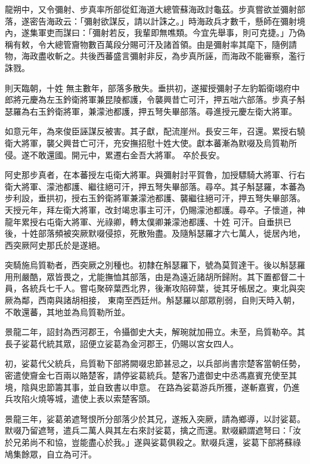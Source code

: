\begin{pinyinscope}
 龍朔中，又令彌射、步真率所部從釭海道大總管蘇海政討龜茲。步真嘗欲並彌射部落，遂密告海政云：「彌射欲謀反，請以計誅之。」時海政兵才數千，懸師在彌射境內，遂集軍吏而謀曰：「彌射若反，我輩即無噍類。今宜先舉事，則可克捷。」乃偽稱有敕，令大總管齎物數百萬段分賜可汗及諸首領。由是彌射率其麾下，隨例請物，海政盡收斬之。共後西蕃盛言彌射非反，為步真所誣，而海政不能審察，濫行誅戮。



 則天臨朝，十姓
 無主數年，部落多散失。垂拱初，遂擢授彌射子左豹韜衛翊府中郎將元慶為左玉鈐衛將軍兼昆陵都護，令襲興昔亡可汗，押五咄六部落。步真子斛瑟羅為右玉鈐衛將軍，兼濛池都護，押五弩失畢部落。尋進授元慶左衛大將軍。



 如意元年，為來俊臣誣謀反被害。其子獻，配流崖州。長安三年，召還。累授右驍衛大將軍，襲父興昔亡可汗，充安撫招慰十姓大使。獻本蕃漸為默啜及烏質勒所侵。遂不敢還國。開元中，累遷右金吾大將軍。
 卒於長安。



 阿史那步真者，在本蕃授左屯衛大將軍。與彌射討平賀魯，加授驃騎大將軍、行右衛大將軍、濛池都護、繼往絕可汗，押五弩失畢部落。尋卒。其子斛瑟羅，本蕃為步利設，垂拱初，授右玉鈐衛將軍兼濛池都護、襲繼往絕可汗，押五弩失畢部落。天授元年，拜左衛大將軍，改封竭忠事主可汗，仍賜濛池都護。尋卒。子懷道，神龍年累授右屯衛大將軍、光祿卿，轉太僕卿兼濛池都護、十姓
 可汗。自垂拱已後，十姓部落頻被突厥默啜侵掠，死散殆盡。及隨斛瑟羅才六七萬人，徙居內地，西突厥阿史那氏於是遂絕。



 突騎施烏質勒者，西突厥之別種也。初隸在斛瑟羅下，號為莫賀達干。後以斛瑟羅用刑嚴酷，眾皆畏之，尤能撫恤其部落，由是為遠近諸胡所歸附。其下置都督二十員，各統兵七千人。嘗屯聚碎葉西北界，後漸攻陷碎葉，徙其牙帳居之。東北與突厥為鄰，西南與諸胡相接，
 東南至西廷州。斛瑟羅以部眾削弱，自則天時入朝，不敢還蕃，其地並為烏質勒所並。



 景龍二年，詔封為西河郡王，令攝御史大夫，解琬就加冊立。未至，烏質勒卒。其長子娑葛代統其眾，詔便立娑葛為金河郡王，仍賜以宮女四人。



 初，娑葛代父統兵，烏質勒下部將闕啜忠節甚忌之，以兵部尚書宗楚客當朝任勢，密遣使齎金七百兩以賂楚客，請停娑葛統兵。楚客乃遣御史中丞馮嘉賓充使至其境，陰與忠節籌其事，並自致書以申意。
 在路為娑葛游兵所獲，遂斬嘉賓，仍進兵攻陷火燒等城，遣使上表以索楚客頭。



 景龍三年，娑葛弟遮弩恨所分部落少於其兄，遂叛入突厥，請為鄉導，以討娑葛。默啜乃留遮弩，遣兵二萬人與其左右來討娑葛，擒之而還。默啜顧謂遮弩曰：「汝於兄弟尚不和協，豈能盡心於我。」遂與娑葛俱殺之。默啜兵還，娑葛下部將蘇祿鳩集餘眾，自立為可汗。




\end{pinyinscope}
